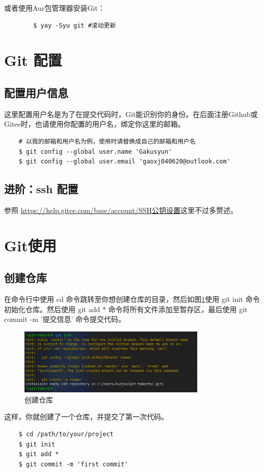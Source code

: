 \documentclass[UTF8]{ctexart}
\begin{document}
或者使用Aur包管理器安装Git：
\begin{verbatim}
        $ yay -Syu git #滚动更新
\end{verbatim}
\newpage
\section{Git 配置}
\subsection{配置用户信息}
这里配置用户名是为了在提交代码时，Git能识别你的身份。在后面注册Github或Gitee时，也请使用你配置的用户名，绑定你这里的邮箱。
\begin{verbatim}
    # 以我的邮箱和用户名为例，使用时请替换成自己的邮箱和用户名
    $ git config --global user.name 'Gakusyun' 
    $ git config --global user.email 'gaoxj040620@outlook.com'
\end{verbatim}
\subsection{进阶：ssh 配置}
参照 \href{https://help.gitee.com/base/account/SSH公钥设置}{https://help.gitee.com/base/account/SSH公钥设置}这里不过多赘述。
\section{Git使用}
\subsection{创建仓库}
在命令行中使用 cd 命令跳转至你想创建仓库的目录，然后如图\ref{creat-git-base}使用 git init 命令初始化仓库。然后使用 git add * 命令将所有文件添加至暂存区，最后使用 git commit -m '提交信息' 命令提交代码。
\begin{figure}[h]
    \centering
    \includegraphics[width=0.8\textwidth]{./img/creat-git-base}
    \caption{创建仓库}
    \label{creat-git-base}
\end{figure}
这样，你就创建了一个仓库，并提交了第一次代码。
\begin{verbatim}
    $ cd /path/to/your/project
    $ git init
    $ git add *
    $ git commit -m 'first commit'
\end{verbatim}
\end{document}

